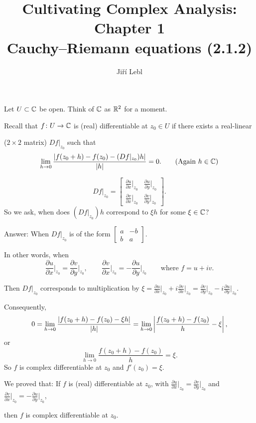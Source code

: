 \documentclass[10pt,aspectratio=169]{beamer}
\author{Ji\v{r}\'i Lebl}
\institute[OSU]{%
Departemento pri Matematiko de Oklahoma {\^S}tata Universitato}
\title{Cultivating Complex Analysis: Chapter 1\\%
Cauchy--Riemann equations (2.1.2)}
\date{}
\begin{document}
\begin{frame}
\titlepage
\end{frame}

\begin{frame}
Let $U \subset {\mathbb{C}}$ be open.  Think of ${\mathbb{C}}$ as ${\mathbb{R}}^2$ for a moment.

\pause
\medskip

Recall that $f \colon U \to {\mathbb{C}}$ is (real) differentiable at $z_0 \in U$ if
there exists a real-linear

($2\times 2$ matrix) $Df|_{z_0}$ such that
\[
\lim_{h \to 0} \frac{\lvert {f(z_0+h) - f(z_0) - (Df|_{z_0}) h} \rvert}{\lvert {h} \rvert} = 0 .
\qquad \text{(Again $h\in {\mathbb{C}}$)}
\]

\pause

\[
Df|_{z_0} =
\begin{bmatrix}
\frac{\partial u}{\partial x}\big|_{z_0} & \frac{\partial u}{\partial
y}\big|_{z_0} \\[5pt]
\frac{\partial v}{\partial x}\big|_{z_0} & \frac{\partial v}{\partial y}\big|_{z_0}
\end{bmatrix} .
\]
\pause
So we ask, when does $(Df|_{z_0})h$ correspond to $\xi h$ for some $\xi \in {\mathbb{C}}$?

\medskip
\pause

Answer: When $Df|_{z_0}$ is of the form
$\left[ \begin{smallmatrix}
a & -b \\ b & a
\end{smallmatrix} \right]$.

\medskip
\pause

In other words, when
\[
\frac{\partial u}{\partial x}\Big|_{z_0} =
\frac{\partial v}{\partial y}\Big|_{z_0}
, \qquad
\frac{\partial v}{\partial x}\Big|_{z_0} =
-\frac{\partial u}{\partial y}\Big|_{z_0}
\qquad \text{where }
f= u + iv. 
\]

\pause
Then
$Df|_{z_0}$ corresponds to multiplication by 
$\xi = \frac{\partial u}{\partial x}\big|_{z_0} + i \frac{\partial v}{\partial
x}\big|_{z_0} = \frac{\partial v}{\partial y}\big|_{z_0} - i \frac{\partial u}{\partial
y}\big|_{z_0}$.

\end{frame}

\begin{frame}
Consequently,
\begin{equation*}
0 = \lim_{h \to 0} \frac{\lvert {f(z_0+h) - f(z_0) - \xi h} \rvert}{\lvert {h} \rvert} =
\lim_{h \to 0} \left\lvert {\frac{f(z_0+h) - f(z_0)}{h} - \xi} \right\rvert ,
\end{equation*}
\pause
or
\begin{equation*}
\lim_{h \to 0} \frac{f(z_0+h) - f(z_0)}{h} = \xi .
\end{equation*}
\pause
So $f$ is complex differentiable at $z_0$ and $f'(z_0) = \xi$.

\medskip
\pause

We proved that: If $f$ is (real) differentiable at $z_0$, with
$\frac{\partial u}{\partial x}\big|_{z_0} = \frac{\partial v}{\partial
y}\big|_{z_0}$ and $\frac{\partial v}{\partial x}\big|_{z_0} = -\frac{\partial
u}{\partial y}\big|_{z_0}$,

then $f$ is complex differentiable at $z_0$.

\end{frame}
\end{document}
